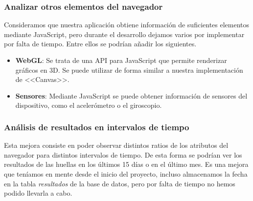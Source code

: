 \subsubsection{Analizar otros elementos del navegador}
Consideramos que nuestra aplicación obtiene información de suficientes elementos mediante JavaScript, pero durante el desarrollo dejamos varios por implementar por falta de tiempo. Entre ellos se podrían añadir los siguientes.
\begin{itemize}
    \item \textbf{WebGL}: Se trata de una API para JavaScript que permite renderizar gráficos en 3D. Se puede utilizar de forma similar a nuestra implementación de <<Canvas>>.
    \item \textbf{Sensores}: Mediante JavaScript se puede obtener información de sensores del dispositivo, como el acelerómetro o el giroscopio.
\end{itemize}
\subsubsection{Análisis de resultados en intervalos de tiempo}
Esta mejora consiste en poder observar distintos ratios de los atributos del navegador para distintos intervalos de tiempo. De esta forma se podrían ver los resultados de las huellas en los últimos 15 días o en el último mes. Es una mejora que teníamos en mente desde el inicio del proyecto, incluso almacenamos la fecha en la tabla \textit{resultados} de la base de datos, pero por falta de tiempo no hemos podido llevarla a cabo.